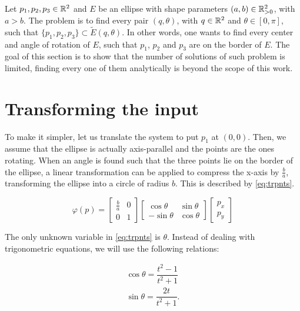 Let $p_1, p_2, p_3 \in \mathbb{R}^2$ and $E$ be an ellipse with shape parameters $(a, b) \in \mathbb{R}^2_{>0}$, with $a > b$. The problem is to find every pair $(q, \theta)$, with $q \in \mathbb{R}^2$ and $\theta \in [0, \pi]$, such that $\{p_1, p_2, p_3\} \subset \tilde{E}(q, \theta)$. In other words, one wants to find every center and angle of rotation of $E$, such that $p_1$, $p_2$ and $p_3$ are on the border of $E$.
The goal of this section is to show that the number of solutions of such problem is limited, finding every one of them analytically is beyond the scope of this work.

\section{Transforming the input}

To make it simpler, let us translate the system to put $p_1$ at $(0,0)$. Then, we assume that the ellipse is actually axis-parallel and the points are the ones rotating. When an angle is found such that the three points lie on the border of the ellipse, a linear transformation can be applied to compress the x-axis by $\frac{b}{a}$, transforming the ellipse into a circle of radius $b$. This is described by \autoref{eq:trpnts}.

\begin{equation}\label{eq:trpnts}
\varphi(p)=\left[\begin{array}{cc}
\frac{b}{a}&0\\
0&1
\end{array}\right]
\left[\begin{array}{cc}
\cos{\theta}&\sin{\theta}\\
-\sin{\theta}&\cos{\theta}
\end{array}\right]\left[\begin{array}{c}
p_x\\
p_y
\end{array}\right]
\end{equation}

The only unknown variable in \autoref{eq:trpnts} is $\theta$. Instead of dealing with trigonometric equations, we will use the following relations:

\begin{equation}\label{eq:trigId}
	\begin{array}{c}
\cos{\theta} = \dfrac{t^2-1}{t^2+1}\\
\sin{\theta} = \dfrac{2t}{t^2+1}.
\end{array}
\end{equation}

